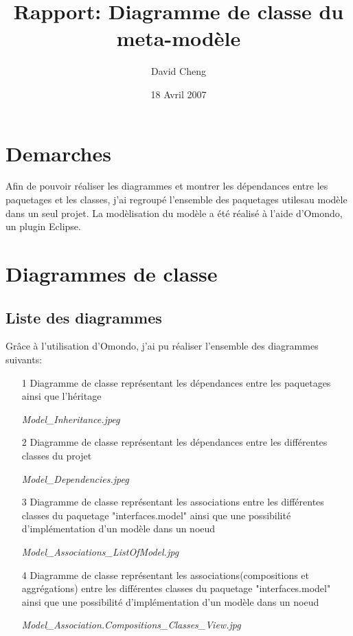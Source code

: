 \documentclass{article}
\title{Rapport: Diagramme de classe du meta-mod\`ele}
\author{David Cheng}
\date{18 Avril 2007}
\begin{document}
\maketitle
\section{Demarches}
\indent
Afin de pouvoir r\'ealiser les diagrammes et montrer les d\'ependances entre les paquetages et les classes, j'ai regroup\'e l'ensemble des paquetages utilesau mod\`ele dans un seul projet.
La mod\`elisation du mod\`ele a \'et\'e r\'ealis\'e \`a l'aide d'Omondo, un plugin Eclipse.


\section{Diagrammes de classe}
\subsection{Liste des diagrammes}

Gr\^ace à l'utilisation d'Omondo, j'ai pu r\'ealiser l'ensemble des diagrammes suivants:

\begin{itemize}
\item[1] Diagramme de classe repr\'esentant les d\'ependances entre les paquetages ainsi que l'h\'eritage

\textit{Model\_Inheritance.jpeg}

\item[2] Diagramme de classe repr\'esentant les d\'ependances entre les diff\'erentes classes du projet

\textit{Model\_Dependencies.jpeg}

\item[3] Diagramme de classe représentant les associations
entre les différentes classes du paquetage "interfaces.model"
ainsi que une possibilité d'implémentation d'un modèle dans un noeud

\textit{Model\_Associations\_ListOfModel.jpg}

\item[4] Diagramme de classe repr\'esentant les associations(compositions et aggrégations) 
entre les différentes classes du paquetage "interfaces.model"
ainsi que une possibilité d'implémentation d'un modèle dans un noeud

\textit{Model\_Association.Compositions\_Classes\_View.jpg}
\end{itemize}
\end{document}
